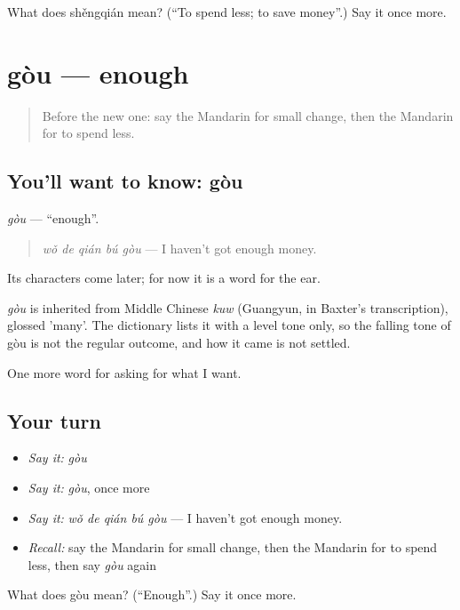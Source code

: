 \begin{tcolorbox}[breakable,colback=teal!4,colframe=teal!35!black,title={Before you move on}]
What does shěngqián mean? (\textquotedblleft{}To spend less; to save money\textquotedblright{}.) Say it once more.
\end{tcolorbox}
\section[gòu]{gòu — enough}

\label{lesson:ZH-C188-gou}



\begin{quote}
Before the new one: say the Mandarin for small change, then the Mandarin for to spend less.
\end{quote}

\subsection*{You'll want to know: gòu}
\emph{gòu} — \textquotedblleft{}enough\textquotedblright{}.

\begin{quote}
\emph{wǒ de qián bú gòu} — I haven't got enough money.
\end{quote}

Its characters come later; for now it is a word for the ear.

\begin{cousinweb}
\emph{gòu} is inherited from Middle Chinese \emph{kuw} (Guangyun, in Baxter's transcription), glossed 'many'. The dictionary lists it with a level tone only, so the falling tone of gòu is not the regular outcome, and how it came is not settled.
\end{cousinweb}

\begin{grammarlens}[title={What you've built}]
One more word for asking for what I want.
\end{grammarlens}

\subsection*{Your turn}
\begin{itemize}
\raggedright
  \item \emph{Say it:} \emph{gòu}
  \item \emph{Say it:} \emph{gòu}, once more
  \item \emph{Say it:} \emph{wǒ de qián bú gòu} — I haven't got enough money.
  \item \emph{Recall:} say the Mandarin for small change, then the Mandarin for to spend less, then say \emph{gòu} again
\end{itemize}

\begin{tcolorbox}[breakable,colback=teal!4,colframe=teal!35!black,title={Before you move on}]
What does gòu mean? (\textquotedblleft{}Enough\textquotedblright{}.) Say it once more.
\end{tcolorbox}
